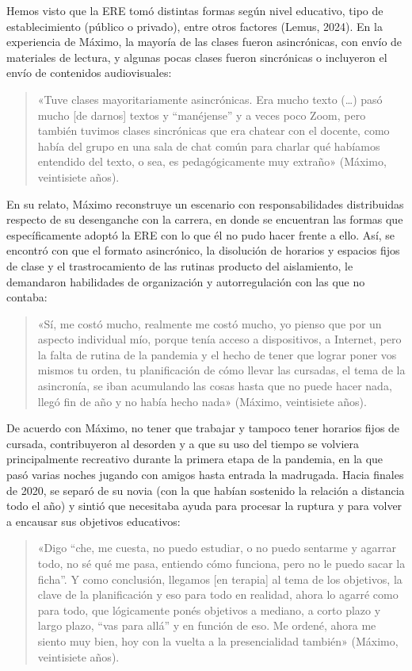 Hemos visto que la ERE tomó distintas formas según nivel educativo, tipo de establecimiento (público o privado), entre otros factores (Lemus, 2024). En la experiencia de Máximo, la mayoría de las clases fueron asincrónicas, con envío de materiales de lectura, y algunas pocas clases fueron sincrónicas o incluyeron el envío de contenidos audiovisuales:

\begin{quote}
«Tuve clases mayoritariamente asincrónicas. Era mucho texto (\ldots) pasó mucho {[}de darnos{]} textos y ``manéjense'' y a veces poco Zoom, pero también tuvimos clases sincrónicas que era chatear con el docente, como había del grupo en una sala de chat común para charlar qué habíamos entendido del texto, o sea, es pedagógicamente muy extraño» (Máximo, veintisiete años).
\end{quote}

En su relato, Máximo reconstruye un escenario con responsabilidades distribuidas respecto de su desenganche con la carrera, en donde se encuentran las formas que específicamente adoptó la ERE con lo que él no pudo hacer frente a ello. Así, se encontró con que el formato asincrónico, la disolución de horarios y espacios fijos de clase y el trastrocamiento de las rutinas producto del aislamiento, le demandaron habilidades de organización y autorregulación con las que no contaba:

\begin{quote}
«Sí, me costó mucho, realmente me costó mucho, yo pienso que por un aspecto individual mío, porque tenía acceso a dispositivos, a Internet, pero la falta de rutina de la pandemia y el hecho de tener que lograr poner vos mismos tu orden, tu planificación de cómo llevar las cursadas, el tema de la asincronía, se iban acumulando las cosas hasta que no puede hacer nada, llegó fin de año y no había hecho nada» (Máximo, veintisiete años).
\end{quote}

De acuerdo con Máximo, no tener que trabajar y tampoco tener horarios fijos de cursada, contribuyeron al desorden y a que su uso del tiempo se volviera principalmente recreativo durante la primera etapa de la pandemia, en la que pasó varias noches jugando con amigos hasta entrada la madrugada. Hacia finales de 2020, se separó de su novia (con la que habían sostenido la relación a distancia todo el año) y sintió que necesitaba ayuda para procesar la ruptura y para volver a encausar sus objetivos educativos:

\begin{quote}
«Digo ``che, me cuesta, no puedo estudiar, o no puedo sentarme y agarrar todo, no sé qué me pasa, entiendo cómo funciona, pero no le puedo sacar la ficha''. Y como conclusión, llegamos {[}en terapia{]} al tema de los objetivos, la clave de la planificación y eso para todo en realidad, ahora lo agarré como para todo, que lógicamente ponés objetivos a mediano, a corto plazo y largo plazo, ``vas para allá'' y en función de eso. Me ordené, ahora me siento muy bien, hoy con la vuelta a la presencialidad también» (Máximo, veintisiete años).
\end{quote}

